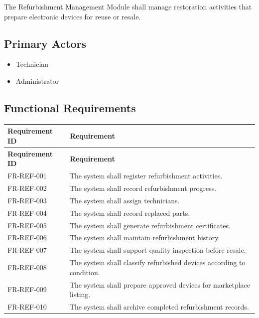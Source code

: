 The Refurbishment Management Module shall manage restoration activities
that prepare electronic devices for reuse or resale.

\subsection{Primary Actors}

\begin{itemize}
\item Technician
\item Administrator
\end{itemize}

\subsection{Functional Requirements}

\begin{longtable}{|p{3cm}|p{10.2cm}|}

\hline
\textbf{Requirement ID} &
\textbf{Requirement}\\
\hline
\endfirsthead

\hline
\textbf{Requirement ID} &
\textbf{Requirement}\\
\hline
\endhead

FR-REF-001 &
The system shall register refurbishment activities.\\
\hline

FR-REF-002 &
The system shall record refurbishment progress.\\
\hline

FR-REF-003 &
The system shall assign technicians.\\
\hline

FR-REF-004 &
The system shall record replaced parts.\\
\hline

FR-REF-005 &
The system shall generate refurbishment certificates.\\
\hline

FR-REF-006 &
The system shall maintain refurbishment history.\\
\hline

FR-REF-007 &
The system shall support quality inspection before resale.\\
\hline

FR-REF-008 &
The system shall classify refurbished devices according to condition.\\
\hline

FR-REF-009 &
The system shall prepare approved devices for marketplace listing.\\
\hline

FR-REF-010 &
The system shall archive completed refurbishment records.\\
\hline

\end{longtable}

